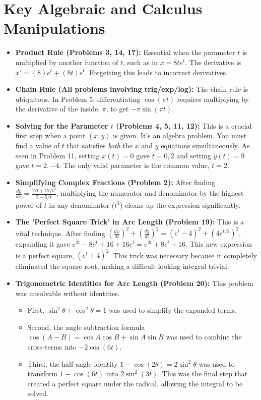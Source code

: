 \documentclass{article}
\begin{document}
\section{Key Algebraic and Calculus Manipulations}
\begin{itemize}
    \item \textbf{Product Rule (Problems 3, 14, 17):} Essential when the parameter $t$ is multiplied by another function of $t$, such as in $x = 8te^t$. The derivative is $x' = (8)e^t + (8t)e^t$. Forgetting this leads to incorrect derivatives.
    \item \textbf{Chain Rule (All problems involving trig/exp/log):} The chain rule is ubiquitous. In Problem 5, differentiating $\cos(\pi t)$ requires multiplying by the derivative of the inside, $\pi$, to get $-\pi\sin(\pi t)$.
    \item \textbf{Solving for the Parameter $t$ (Problems 4, 5, 11, 12):} This is a crucial first step when a point $(x,y)$ is given. It's an algebra problem. You must find a value of $t$ that satisfies \textit{both} the $x$ and $y$ equations simultaneously. As seen in Problem 11, setting $x(t)=0$ gave $t=0, 2$ and setting $y(t)=9$ gave $t=2, -4$. The only valid parameter is the common value, $t=2$.
    \item \textbf{Simplifying Complex Fractions (Problem 2):} After finding $\frac{dy}{dx} = \frac{12t + 12/t^3}{5 - 5/t}$, multiplying the numerator and denominator by the highest power of $t$ in any denominator ($t^3$) cleans up the expression significantly.
    \item \textbf{The 'Perfect Square Trick' in Arc Length (Problem 19):} This is a vital technique. After finding $(\frac{dx}{dt})^2 + (\frac{dy}{dt})^2 = (e^t-4)^2 + (4e^{t/2})^2$, expanding it gave $e^{2t} - 8e^t + 16 + 16e^t = e^{2t} + 8e^t + 16$. This new expression is a perfect square, $(e^t+4)^2$. This trick was necessary because it completely eliminated the square root, making a difficult-looking integral trivial.
    \item \textbf{Trigonometric Identities for Arc Length (Problem 20):} This problem was unsolvable without identities.
        \begin{itemize}
            \item First, $\sin^2\theta + \cos^2\theta = 1$ was used to simplify the expanded terms.
            \item Second, the angle subtraction formula $\cos(A-B) = \cos A \cos B + \sin A \sin B$ was used to combine the cross-terms into $-2\cos(6t)$.
            \item Third, the half-angle identity $1-\cos(2\theta) = 2\sin^2\theta$ was used to transform $1-\cos(6t)$ into $2\sin^2(3t)$. This was the final step that created a perfect square under the radical, allowing the integral to be solved.

\end{itemize}
\end{itemize}
\end{document}
